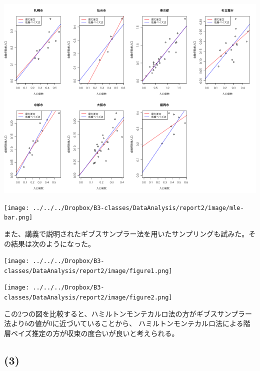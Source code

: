 \documentclass[a4j,xelatex,ja=standard,jafont=hiragino-pron, 10pt]{bxjsarticle}
\let\origfigure=\figure
\let\endorigfigure=\endfigure
\renewenvironment{figure}[1][]{%
  \origfigure[H]
}{%
  \endorigfigure
}
\begin{document}
\begin{figure}
\centering
\includegraphics[width=15cm]{../src/output/image/mle-mcmc.png}
\caption{階層ベイズ法(ハミルトンモンテカルロ法)と最尤推定法の比較}
\end{figure}

\begin{figure}
  \centering
  \texttt{[image: ../../../Dropbox/B3-classes/DataAnalysis/report2/image/mle-bar.png]}
  \caption{ハミルトンモンテカルロ法と最尤推定法の$a$ と $b$ の値の比較}
  \label{}
\end{figure}

また、講義で説明されたギブスサンプラー法を用いたサンプリングも試みた。その結果は次のようになった。

\begin{figure}
  \centering
  \texttt{[image: ../../../Dropbox/B3-classes/DataAnalysis/report2/image/figure1.png]}
  \caption{ギブスサンプラー法と最尤推定法の比較}
\end{figure}

\begin{figure}
  \centering
  \texttt{[image: ../../../Dropbox/B3-classes/DataAnalysis/report2/image/figure2.png]}
  \caption{ギブスサンプラー法と最尤推定法の $a$ と $b$ の比較}
  \label{}
\end{figure}

この2つの図を比較すると、ハミルトンモンテカルロ法の方がギブスサンプラー法より$b$の値が0に近づいていることから、
ハミルトンモンテカルロ法による階層ベイズ推定の方が収束の度合いが良いと考えられる。

\subsection*{(3)}
\end{document}
